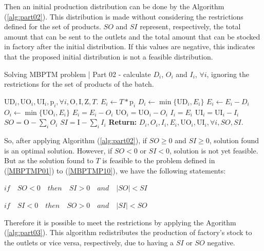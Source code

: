 \documentclass[10pt,fleqn,a4paper,twoside]{article}
\begin{document}
Then an initial production distribution can be done by the Algorithm (\ref{alg:part02}). This distribution is made without considering the restrictions defined for the set of products. $SO$ and $SI$ represent, respectively, the total amount that can be sent to the outlets and the total amount that can be stocked in factory after the initial distribution. If this values are negative, this indicates that the proposed initial distribution is not a feasible distribution.

\begin{algorithm}
\caption{Solving MBPTM problem | Part 02 - calculate $D_i$, $O_i$ and $I_i$, $\forall i$, ignoring the restrictions for the set of products of the batch.}\label{alg:part02}
\begin{algorithmic}
	\Require $\textrm{UD}_i, \textrm{UO}_i, \textrm{UI}_i, \textrm{p}_i, \forall i, \textrm{O}, \textrm{I}, \textrm{Z}, T$.
		\State $E_i \gets T * \textrm{p}_i$
		\State $D_i \gets \min \{\textrm{UD}_i, E_i\}$
		\State $E_i \gets E_i - D_i$
		\State $O_i \gets \min \{\textrm{UO}_i, E_i\}$
		\State $E_i = E_i - O_i$
		\State $\textrm{UO}_i = \textrm{UO}_i - O_i$
		\State $I_i = E_i$
		\State $\textrm{UI}_i = \textrm{UI}_i - I_i$
	\EndFor
	\State $SO = \textrm{O} - \sum_i{O_i}$
	\State $SI = \textrm{I} - \sum_i{I_i}$
	\State \textbf{Return:} $D_i, O_i, I_i, E_i, \textrm{UO}_i, \textrm{UI}_i, \forall i, SO, SI$.
\end{algorithmic}
\end{algorithm}

So, after applying Algorithm (\ref{alg:part02}), if $SO \geq 0$ and $SI \geq 0$, solution found is an optimal solution. However, if $SO < 0$ or $SI <0$, solution is not yet feasible. But as the solution found to $T$ is feasible to the problem defined in (\ref{MBPTMP01}) to (\ref{MBPTMP10}), we have the following statements:

$if \quad SO < 0 \quad then \quad SI > 0 \quad and  \quad |SO| < SI$

$if \quad SI < 0 \quad then \quad SO > 0 \quad and  \quad |SI| < SO$

Therefore it is possible to meet the restrictions by applying the Agorithm (\ref{alg:part03}). This algorithm redistributes the production of factory's stock to the outlets or vice versa, respectively, due to having a $SI$ or $SO$ negative.
\end{document}

